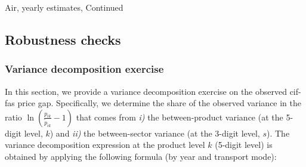 \documentclass[11pt,twoside, authoryear]{elsarticle}
\begin{document}
\begin{landscape}
\begin{table}[htbp]
\begin{center}
\end{center}
\label{tab_oa:result_air_ally3}%
\end{table}%

\end{landscape}


\setcounter{table}{1}

\begin{table}[htbp]

\caption{Air, yearly estimates, Continued}
\begin{center}
	
	
	
\end{center}
\label{tab_oa:result_air_ally3}%
\end{table}%

\setcounter{table}{0}
\renewcommand{\thetable}{D.\arabic{table}}

\setcounter{figure}{0}
\renewcommand{\thefigure}{D.\arabic{figure}}

\subsection{Robustness checks}


\subsubsection{Variance decomposition exercise \label{app:decomp_variance}}

In this section, we provide a variance decomposition exercise on the observed cif-fas price gap.
Specifically, we determine the share of the observed variance in the ratio $\ln(\frac{p_{ik}}{\widetilde{p}_{ik}}-1)$ that comes from \textit{i)} the between-product variance (at the 5-digit level, $k$) and \textit{ii)} the between-sector variance (at the 3-digit level, $s$).
The variance decomposition expression at the product level $k$ (5-digit level) is obtained by applying the following formula (by year and transport mode):
\end{document}
